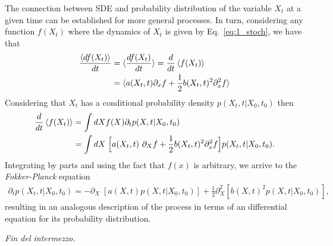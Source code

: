 The connection between SDE and probability distribution of the variable $X_{t}$ at a given time  can be established for more general processes.
In turn, considering any function $f(X_t)$ where the dynamics of $X_t$ is given by Eq.~\eqref{eq:1_stoch}, we have that
\begin{align}
\frac{\mathinner{\langle df(X_t)\rangle}}{dt} &= \mathinner{\langle \frac{df(X_t)}{dt}\rangle} = \frac{d}{dt} \mathinner{\langle f(X_t)\rangle} \\
&= \mathinner{\langle a(X_t,t) \partial_x f + \frac{1}{2} b(X_t,t)^2 \partial_x^2 f\rangle}
\end{align}
Considering that $X_t$ has a conditional probability density $p(X_t,t|X_0,t_0)$ then
\begin{align}
\frac{d}{dt}\expect{f(X_t)} &= \int dX f(X) \partial_t p(X,t|X_0,t_0) \\
&= \int dX \; \Big[a(X_t,t) \partial_X f + \frac{1}{2} b(X_t,t)^2 \partial_x^2 f\Big] p(X_t,t|X_0,t_0).
\end{align}
Integrating by parts and using the fact that $f(x)$ is arbitrary, we arrive to the \textit{Fokker-Planck} equation
\begin{align}
\partial_t p(X_t,t|X_0,t_0) = - \partial_X\;[a(X,t) p(X,t|X_0,t_0)] + \frac{1}{2} \partial_X^2[b(X,t)^2 p(X,t|X_0,t_0)],
\end{align}
resulting in an analogous description of the process in terms of an differential equation for its probability distribution.

\textit{Fin del intermezzo.}
\vspace{1cm}

